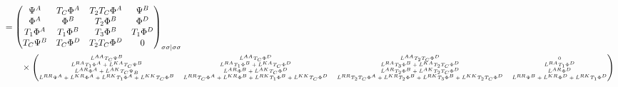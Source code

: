 \documentclass[10pt]{scrartcl}
\begin{document}
\begin{align}
&=
\left( 
\begin{matrix}
\Psi^A & T_C \Phi^A & T_2 T_C \Phi^A & \Psi^B \\
\Phi^A & \Phi^B & T_2 \Phi^B & \Phi^D \\
T_1 \Phi^A & T_1 \Phi^B & T_3 \Phi^B & T_1 \Phi^D \\
T_C \Psi^B & T_C \Phi^D & T_2 T_C \Phi^D & 0
\end{matrix}
\right)_{\sigma \sigma | \sigma \sigma}
\nonumber \\
& \qquad \times
\left(
{\tiny
\begin{matrix}
\dot{L}^{AA} T_C \Psi^B & \dot{L}^{AA} T_C \Phi^D & \dot{L}^{AA} T_2 T_C \Phi^D & 0 \\
\dot{L}^{RA} T_1 \Phi^A + \dot{L}^{KA} T_C \Psi^B & \dot{L}^{RA} T_1 \Phi^B + \dot{L}^{KA} T_C \Phi^D & \dot{L}^{RA} T_3 \Phi^B + \dot{L}^{KA} T_2 T_C \Phi^D & \dot{L}^{RA} T_1 \Phi^D \\
\dot{L}^{AR} \Phi^A + \dot{L}^{AK} T_C \Psi_B & \dot{L}^{AR} \Phi^B + \dot{L}^{AK} T_C \Phi^D & \dot{L}^{AR} T_2 \Phi^B + \dot{L}^{AK} T_2 T_C \Phi^D & \dot{L}^{AR} \Phi^D \\
\dot{L}^{RR} \Psi^A + \dot{L}^{KR} \Phi^A + \dot{L}^{RK} T_1 \Phi^A + \dot{L}^{KK} T_C \Phi^B &
\dot{L}^{RR} T_C \Phi^A + \dot{L}^{KR} \Phi^B + \dot{L}^{RK} T_1 \Phi^B + \dot{L}^{KK} T_C \Phi^D &
\dot{L}^{RR} T_2 T_C \Phi^A + \dot{L}^{KR} T_2 \Phi^B + \dot{L}^{RK} T_3 \Phi^B + \dot{L}^{KK} T_2 T_C \Phi^D &
\dot{L}^{RR} \Psi^B + \dot{L}^{KR} \Phi^D + \dot{L}^{RK} T_1 \Phi^D
\end{matrix}
}
\right)
\end{align}
\end{document}

